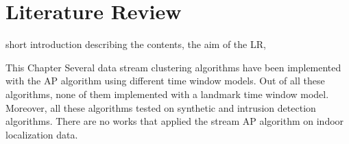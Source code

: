 \documentclass[../UNBThesis2.tex]{subfiles}
\begin{document}
\chapter{Literature Review}

short introduction describing the contents, the aim of the LR,

This Chapter 
Several data stream clustering algorithms have been implemented with the AP algorithm using different time window models. Out of all these algorithms, none of them implemented with a landmark time window model. Moreover, all these algorithms tested on synthetic and intrusion detection algorithms. There are no works that applied the stream AP algorithm on indoor localization data.



\end{document}
